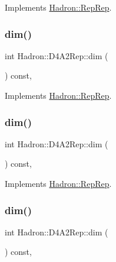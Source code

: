 Implements \mbox{\hyperlink{structHadron_1_1RepRep_a92c8802e5ed7afd7da43ccfd5b7cd92b}{Hadron\+::\+Rep\+Rep}}.

\mbox{\label{structHadron_1_1D4A2Rep_adc6df0a40f7af491e096e53145f91543}} 
\subsubsection{\texorpdfstring{dim()}{dim()}\hspace{0.1cm}{\footnotesize\ttfamily [3/5]}}
{\footnotesize\ttfamily int Hadron\+::\+D4\+A2\+Rep\+::dim (\begin{DoxyParamCaption}{ }\end{DoxyParamCaption}) const\hspace{0.3cm}{\ttfamily [inline]}, {\ttfamily [virtual]}}



Implements \mbox{\hyperlink{structHadron_1_1RepRep_a92c8802e5ed7afd7da43ccfd5b7cd92b}{Hadron\+::\+Rep\+Rep}}.

\mbox{\label{structHadron_1_1D4A2Rep_adc6df0a40f7af491e096e53145f91543}} 
\subsubsection{\texorpdfstring{dim()}{dim()}\hspace{0.1cm}{\footnotesize\ttfamily [4/5]}}
{\footnotesize\ttfamily int Hadron\+::\+D4\+A2\+Rep\+::dim (\begin{DoxyParamCaption}{ }\end{DoxyParamCaption}) const\hspace{0.3cm}{\ttfamily [inline]}, {\ttfamily [virtual]}}



Implements \mbox{\hyperlink{structHadron_1_1RepRep_a92c8802e5ed7afd7da43ccfd5b7cd92b}{Hadron\+::\+Rep\+Rep}}.

\mbox{\label{structHadron_1_1D4A2Rep_adc6df0a40f7af491e096e53145f91543}} 
\subsubsection{\texorpdfstring{dim()}{dim()}\hspace{0.1cm}{\footnotesize\ttfamily [5/5]}}
{\footnotesize\ttfamily int Hadron\+::\+D4\+A2\+Rep\+::dim (\begin{DoxyParamCaption}{ }\end{DoxyParamCaption}) const\hspace{0.3cm}{\ttfamily [inline]}, {\ttfamily [virtual]}}



